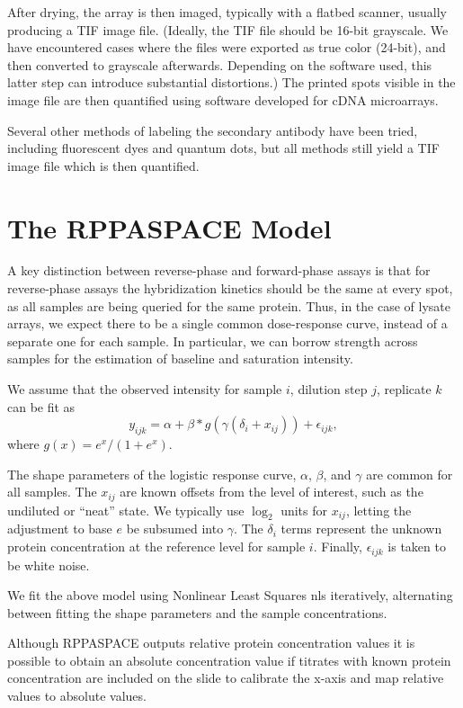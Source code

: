 \documentclass[
]{article}
\begin{document}
After drying, the array is then imaged, typically with a flatbed
scanner, usually producing a TIF image file. (Ideally, the TIF file
should be 16-bit grayscale. We have encountered cases where the files
were exported as true color (24-bit), and then converted to grayscale
afterwards. Depending on the software used, this latter step can
introduce substantial distortions.) The printed spots visible in the
image file are then quantified using software developed for cDNA
microarrays.

Several other methods of labeling the secondary antibody have been
tried, including fluorescent dyes and quantum dots, but all methods
still yield a TIF image file which is then quantified.

\hypertarget{model}{%
\section{The RPPASPACE Model}\label{model}}

A key distinction between reverse-phase and forward-phase assays is that
for reverse-phase assays the hybridization kinetics should be the same
at every spot, as all samples are being queried for the same protein.
Thus, in the case of lysate arrays, we expect there to be a single
common dose-response curve, instead of a separate one for each sample.
In particular, we can borrow strength across samples for the estimation
of baseline and saturation intensity.

We assume that the observed intensity for sample \(i\), dilution step
\(j\), replicate \(k\) can be fit as \[
  y_{ijk} = \alpha + \beta * g(\gamma(\delta_i + x_{ij})) + \epsilon_{ijk},
\] where \(g(x) = e^x/(1+e^x)\).

The shape parameters of the logistic response curve, \(\alpha\),
\(\beta\), and \(\gamma\) are common for all samples. The \(x_{ij}\) are
known offsets from the level of interest, such as the undiluted or
``neat'' state. We typically use \(\log_2\) units for \(x_{ij}\),
letting the adjustment to base \(e\) be subsumed into \(\gamma\). The
\(\delta_i\) terms represent the unknown protein concentration at the
reference level for sample \(i\). Finally, \(\epsilon_{ijk}\) is taken
to be white noise.

We fit the above model using Nonlinear Least Squares nls iteratively,
alternating between fitting the shape parameters and the sample
concentrations.

Although RPPASPACE outputs relative protein concentration values it is
possible to obtain an absolute concentration value if titrates with
known protein concentration are included on the slide to calibrate the
x-axis and map relative values to absolute values.
\end{document}

